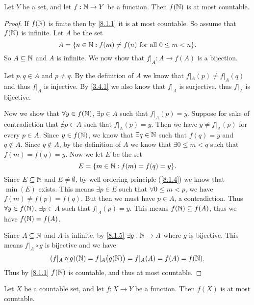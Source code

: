 \begin{prop}\label{8.1.8}
	Let \(Y\) be a set, and let \(f : \mathbb{N} \to Y\) be a function.
	Then \(f(\mathbb{N})\) is at most countable.
\end{prop}

\begin{proof}
	If \(f(\mathbb{N})\) is finite then by \cref{8.1.1} it is at most countable.
	So assume that \(f(\mathbb{N})\) is infinite.
	Let \(A\) be the set
	\[
		A = \set{n \in \N : f(m) \neq f(n) \text{ for all } 0 \leq m < n}.
	\]
	So \(A \subseteq \mathbb{N}\) and \(A\) is infinite.
	We now show that \(f|_A : A \to f(A)\) is a bijection.

	Let \(p, q \in A\) and \(p \neq q\).
	By the definition of \(A\) we know that \(f|_A(p) \neq f|_A(q)\) and thus \(f|_A\) is injective.
	By \cref{3.4.1} we also know that \(f|_A\) is surjective, thus \(f|_A\) is bijective.

	Now we show that \(\forall y \in f(\mathbb{N})\), \(\exists p \in A\) such that \(f|_A(p) = y\).
	Suppose for sake of contradiction that \(\nexists p \in A\) such that \(f|_A(p) = y\).
	Then we have \(y \neq f|_A(p)\) for every \(p \in A\).
	Since \(y \in f(\mathbb{N})\), we know that \(\exists q \in \mathbb{N}\) such that \(f(q) = y\) and \(q \notin A\).
	Since \(q \notin A\), by the definition of \(A\) we know that \(\exists 0 \leq m < q\) such that \(f(m) = f(q) = y\).
	Now we let \(E\) be the set
	\[
		E = \set{m \in \N : f(m) = f(q) = y}.
	\]
	Since \(E \subseteq \mathbb{N}\) and \(E \neq \emptyset\), by well ordering principle (\cref{8.1.4}) we know that \(\min(E)\) exists.
	This means \(\exists p \in E\) such that \(\forall 0 \leq m < p\), we have \(f(m) \neq f(p) = f(q)\).
	But then we must have \(p \in A\), a contradiction.
	Thus \(\forall y \in f(\mathbb{N})\), \(\exists p \in A\) such that \(f|_A(p) = y\).
	This means \(f(\mathbb{N}) \subseteq f(A)\), thus we have \(f(\mathbb{N}) = f(A)\).

	Since \(A \subseteq \mathbb{N}\) and \(A\) is infinite, by \cref{8.1.5} \(\exists g : \mathbb{N} \to A\) where \(g\) is bijective.
	This means \(f|_A \circ g\) is bijective and we have
	\[
		(f|_A \circ g)(\mathbb{N}) = f|_A\big(g(\mathbb{N})\big) = f|_A(A) = f(A) = f(\mathbb{N}).
	\]
	Thus by \cref{8.1.1} \(f(\mathbb{N})\) is countable, and thus at most countable.
\end{proof}

\begin{cor}\label{8.1.9}
	Let \(X\) be a countable set, and let \(f : X \to Y\) be a function.
	Then \(f(X)\) is at most countable.
\end{cor}

